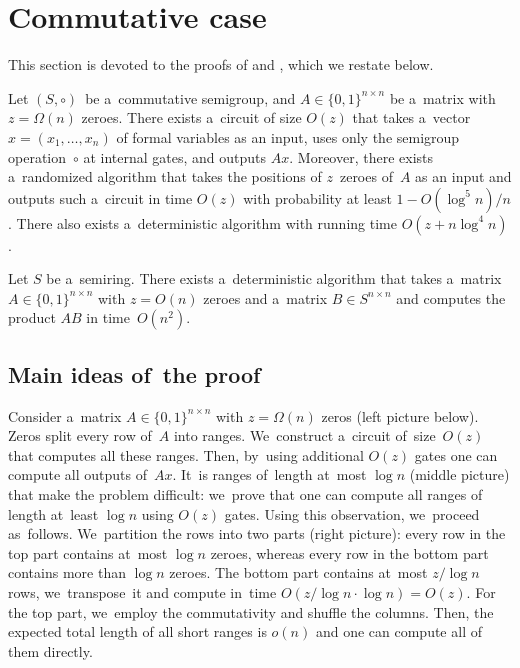 \section{Commutative case}\label{sec-commutative}

This section is devoted to the proofs of  and
, which we %
restate  %
below.

%
\begin{theorem}
    \label{thm:upperbound}
	Let $(S, \circ)$~be a~commutative semigroup,
	and $A \in \{0,1\}^{n \times n}$ be a~matrix
	with~$z=\Omega(n)$ zeroes.
	There exists a~circuit of size $O(z)$ that takes
	a~vector $x = (x_1,\ldots, x_n)$ of formal variables as an input,
	uses only the semigroup operation~$\circ$ at internal gates,
	and outputs $Ax$. Moreover, there exists a~randomized
	algorithm that takes the positions of $z$~zeroes of~$A$
	as an input and outputs such a~circuit in time $O(z)$
	with probability at least $1-O(\log^5n)/n$. There also
	exists a~deterministic algorithm with running time $O(z+n\log^4n)$.
\end{theorem}

%
%
%
%
%
%
%
%
%
%
%
%
%

\begin{corollary}
    \label{cor:matrixmultiplication}
    Let $S$ be a~semiring. There exists a~deterministic algorithm that takes a~matrix
    ${A \in \{0,1\}^{n \times n}}$ with $z=O(n)$ zeroes and a~matrix
    $B \in S^{n \times n}$ and computes the product $AB$ in time~$O(n^2)$.
\end{corollary}

\subsection{Main ideas of~the proof}

Consider a~matrix $A \in \{0,1\}^{n \times n}$
with $z=\Omega(n)$ zeros (left picture below).
Zeros split every row of~$A$ into ranges.
We~construct a~circuit of~size~$O(z)$ that computes all these ranges. Then, by~using additional $O(z)$ gates one can
compute all outputs of~$Ax$. It~is ranges of~length at~most $\log n$ (middle picture) that make the problem difficult:
we~prove that one can compute
all ranges of length at~least $\log n$ using $O(z)$ gates.
Using this observation, we~proceed as~follows.
We~partition the rows into two parts (right picture): every row in the top part contains at~most $\log n$ zeroes, whereas every row in the bottom part contains more than $\log n$ zeroes. The bottom part contains at~most $z/\log n$
%
rows,
we~transpose~it and compute in~time $O(z/\log n \cdot \log n)=O(z)$. For the top part, we~employ the commutativity and shuffle the columns. Then, the expected total length of all short ranges is $o(n)$ and one can
compute all of them directly.


